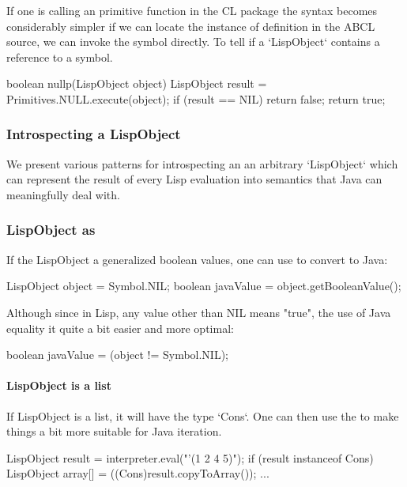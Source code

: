 \documentclass[10pt]{book}
\begin{document}
If one is calling an primitive function in the CL package the syntax
becomes considerably simpler if we can locate the instance of
definition in the ABCL source, we can invoke the symbol directly.  To
tell if a `LispObject` contains a reference to a symbol.

\begin{listing-java}
    boolean nullp(LispObject object) {
      LispObject result = Primitives.NULL.execute(object);
      if (result == NIL) {
        return false;
      }
      return true;
   }
\end{listing-java}

\subsubsection{Introspecting a LispObject}
\label{topic:Introspecting a LispObject}

We present various patterns for introspecting an an arbitrary
`LispObject` which can represent the result of every Lisp evaluation
into semantics that Java can meaningfully deal with.

\subsubsection{LispObject as }

If the LispObject a generalized boolean values, one can use
 to convert to Java:

\begin{listing-java}
     LispObject object = Symbol.NIL;
     boolean javaValue = object.getBooleanValue();
\end{listing-java}

Although since in Lisp, any value other than NIL means "true", the
use of Java equality it quite a bit easier and more optimal:

\begin{listing-java}
    boolean javaValue = (object != Symbol.NIL);
\end{listing-java}

\paragraph{LispObject is a list}

If LispObject is a list, it will have the type `Cons`.  One can then use
the  to make things a bit more suitable for Java
iteration.

\begin{listing-java}
    LispObject result = interpreter.eval("'(1 2 4 5)");
    if (result instanceof Cons) {
      LispObject array[] = ((Cons)result.copyToArray());
      ...
    }
\end{listing-java}
    
\end{document}
